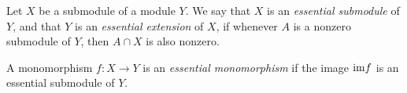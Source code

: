 \documentclass[12pt]{article}
\begin{document}
Let $X$ be a submodule of a module $Y$.
We say that $X$ is an {\it essential submodule} of $Y$,
and that $Y$ is an {\it essential extension} of $X$,
if whenever $A$ is a nonzero submodule of $Y$,
then $A \cap X$ is also nonzero.

A monomorphism $f : X \to Y$ is an {\it essential monomorphism}
if the image ${\rm im} f$ is an essential submodule of $Y$.
\end{document}
